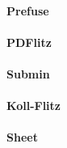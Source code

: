 \documentclass[11pt,a4paper]{article}
\begin{document}
\paragraph{Prefuse}

\paragraph{PDFlitz}

\paragraph{Submin}

\paragraph{Koll-Flitz}

\paragraph{Sheet}

\printbibliography
\end{document}
